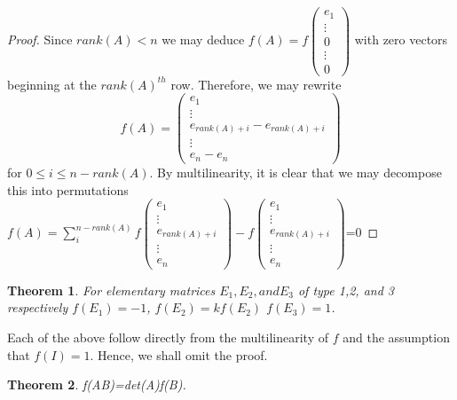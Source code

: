 \documentclass{article}
\newtheorem{thm}{Theorem}
\begin{document}
\begin{proof}
Since $rank(A)<n$ we may deduce $f(A)=f\begin{pmatrix}e_1 \\ \vdots \\ 0 \\ \vdots \\ 0\end{pmatrix}$ with zero vectors beginning at the $rank(A)^{th}$ row. Therefore, we may rewrite $$f(A)=\begin{pmatrix}e_1 \\ \vdots \\ e_{rank(A)+i} - e_{rank(A)+i} \\ \vdots \\ e_n-e_n \end{pmatrix}$$ for $0 \leq i \leq n-rank(A)$. By multilinearity, it is clear that we may decompose this into permutations $f(A)=\sum_{i}^{n-rank(A)}f\begin{pmatrix}e_1 \\ \vdots \\ e_{rank(A)+i} \\ \vdots \\ e_n \end{pmatrix}-f\begin{pmatrix}e_1 \\ \vdots \\  e_{rank(A)+i} \\ \vdots \\ e_n \end{pmatrix}$=0
	
\end{proof}
\begin{thm}
For elementary matrices $E_1, E_2, and E_3$ of type 1,2, and 3 respectively $f(E_1)=-1$, $f(E_2)=kf(E_2)$  $f(E_3)=1$.
\end{thm}
Each of the above follow directly from the multilinearity of $f$ and the assumption that $f(I)=1$. Hence, we shall omit the proof.
\begin{thm}
f(AB)=det(A)f(B).	
\end{thm}
\end{document}
